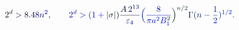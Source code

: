 \documentclass[12pt]{article}
\begin{document}
\makeatletter
\renewcommand*{\@textcolor}[3]{%
  \protect\leavevmode
  \begingroup
    \color#1{#2}#3%
  \endgroup
}
\makeatother
\begin{displaymath}
\mathcolor[RGB]{0,0,15}{2} ^ { \mathcolor[RGB]{0,0,30}{d} } \mathcolor[RGB]{0,0,45}{>} \mathcolor[RGB]{0,0,60}{8} \mathcolor[RGB]{0,0,75}{.} \mathcolor[RGB]{0,0,90}{4} \mathcolor[RGB]{0,0,105}{8} \mathcolor[RGB]{0,0,120}{n} ^ { \mathcolor[RGB]{0,0,135}{2} } \mathcolor[RGB]{0,0,150}{,} \qquad \mathcolor[RGB]{0,0,165}{2} ^ { \mathcolor[RGB]{0,0,180}{d} } \mathcolor[RGB]{0,0,195}{>} \mathcolor[RGB]{0,0,210}{(} \mathcolor[RGB]{0,0,225}{1} \mathcolor[RGB]{0,0,240}{+} \mathcolor[RGB]{0,0,255}{|} \mathcolor[RGB]{0,15,0}{\sigma} \mathcolor[RGB]{0,15,15}{|} \mathcolor[RGB]{0,15,30}{)} \mathcolor[RGB]{0,15,45}{\frac { \mathcolor[RGB]{0,15,60}{A} \, \mathcolor[RGB]{0,15,75}{2} ^ { \mathcolor[RGB]{0,15,90}{1} \mathcolor[RGB]{0,15,105}{3} } } { \mathcolor[RGB]{0,15,120}{\varepsilon} _ { \mathcolor[RGB]{0,15,135}{4} } } } \mathcolor[RGB]{0,15,150}{\Big(} \mathcolor[RGB]{0,15,165}{\frac { \mathcolor[RGB]{0,15,180}{8} } { \mathcolor[RGB]{0,15,195}{\pi} \mathcolor[RGB]{0,15,210}{a} ^ { \mathcolor[RGB]{0,15,225}{2} } \mathcolor[RGB]{0,15,240}{B} _ { \mathcolor[RGB]{0,15,255}{1} } ^ { \mathcolor[RGB]{0,30,0}{2} } } } \mathcolor[RGB]{0,30,15}{\Big)} ^ { \mathcolor[RGB]{0,30,30}{n} \mathcolor[RGB]{0,30,45}{/} \mathcolor[RGB]{0,30,60}{2} } \mathcolor[RGB]{0,30,75}{\Gamma} \mathcolor[RGB]{0,30,90}{(} \mathcolor[RGB]{0,30,105}{n} \mathcolor[RGB]{0,30,120}{-} \mathcolor[RGB]{0,30,135}{\frac { \mathcolor[RGB]{0,30,150}{1} } { \mathcolor[RGB]{0,30,165}{2} } } \mathcolor[RGB]{0,30,180}{)} ^ { \mathcolor[RGB]{0,30,195}{1} \mathcolor[RGB]{0,30,210}{/} \mathcolor[RGB]{0,30,225}{2} } \mathcolor[RGB]{0,30,240}{.}
\end{displaymath}
\end{document}
